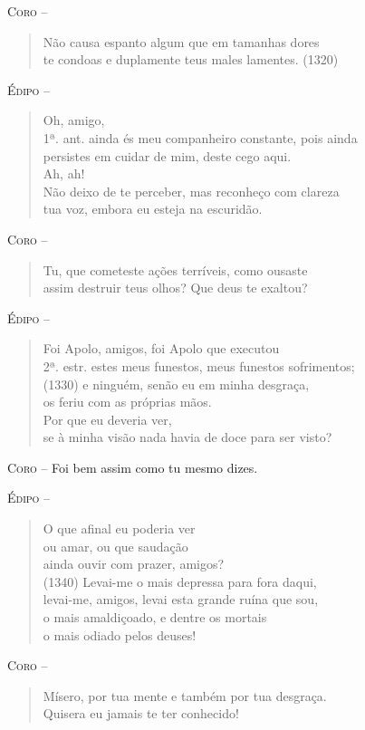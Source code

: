 \textsc{Coro} -- \begin{verse}Não causa espanto algum que em tamanhas dores\\
te condoas e duplamente teus males lamentes. (1320)
\end{verse}

\textsc{Édipo} -- \begin{verse}Oh, amigo,\\ 1ª. ant.
ainda és meu companheiro constante, pois ainda\\
persistes em cuidar de mim, deste cego aqui.\\
Ah, ah!\\
Não deixo de te perceber, mas reconheço com clareza\\
tua voz, embora eu esteja na escuridão.
\end{verse}

\textsc{Coro} -- \begin{verse}Tu, que cometeste ações terríveis, como ousaste\\
assim destruir teus olhos? Que deus te exaltou?
\end{verse}

\textsc{Édipo} -- \begin{verse}Foi Apolo, amigos, foi Apolo que executou\\ 2ª. estr.
estes meus funestos, meus funestos sofrimentos;\\ (1330)
e ninguém, senão eu em minha desgraça,\\
os feriu com as próprias mãos.\\
Por que eu deveria ver,\\
se à minha visão nada havia de doce para ser visto?
\end{verse}

\textsc{Coro} --   Foi bem assim como tu mesmo dizes.

\textsc{Édipo} -- \begin{verse}O que afinal eu poderia ver\\
ou amar, ou que saudação\\
ainda ouvir com prazer, amigos?\\ (1340)
Levai-me o mais depressa para fora daqui,\\
levai-me, amigos, levai esta grande ruína que sou,\\
o mais amaldiçoado, e dentre os mortais\\
o mais odiado pelos deuses!
\end{verse}

\textsc{Coro} -- \begin{verse}Mísero, por tua mente e também por tua desgraça.\\
Quisera eu jamais te ter conhecido!
\end{verse}

